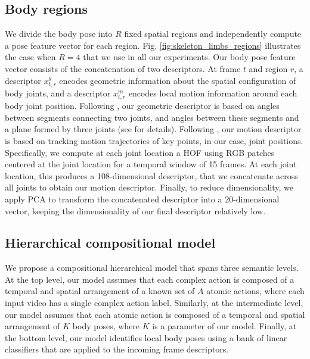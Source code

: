 \subsection{Body regions}
We divide the body pose into $R$ fixed spatial regions and independently compute 
a pose feature vector for each region. Fig. \ref{fig:skeleton_limbs_regions} 
illustrates the case when $R = 4$ that we use in all our experiments. Our body 
pose feature vector consists of the concatenation of two descriptors. At frame 
$t$ and region $r$, a descriptor $x^{g}_{t,r}$ encodes geometric information 
about the spatial configuration of body joints, and a descriptor $x^{m}_{t,r}$ 
encodes local motion information around each body joint position. Following 
\cite{Lillo2014}, our geometric descriptor is based on angles between segments 
connecting two joints, and angles between these segments and a plane formed by 
three joints (see \cite{Lillo2014} for details). Following \cite{WangCVPR2011}, 
our motion descriptor is based on tracking motion trajectories of key points, in 
our case, joint positions. Specifically, we compute at each joint location a HOF 
using RGB patches centered at the joint location for a temporal window of 15 
frames. At each joint location, this produces a 108-dimensional descriptor,  
that we concatenate across all joints to obtain our motion descriptor. Finally, 
to reduce dimensionality, we apply PCA to transform the concatenated descriptor 
into a 20-dimensional vector, keeping the dimensionality of our final descriptor 
relatively low.


\subsection{Hierarchical compositional model}

We propose a compositional hierarchical model that spans three semantic levels. 
At the top level, our model assumes that each complex action is composed of a 
temporal and spatial arrangement of a known set of $A$ atomic actions, where 
each input video has a single complex action label. Similarly, at the 
intermediate level, our model assumes that each atomic action is composed of a 
temporal and spatial arrangement of $K$ body poses, where $K$ is a parameter of 
our model. Finally, at the bottom level, our model identifies local body poses 
using a bank of linear classifiers that are applied to the incoming frame 
descriptors. 

